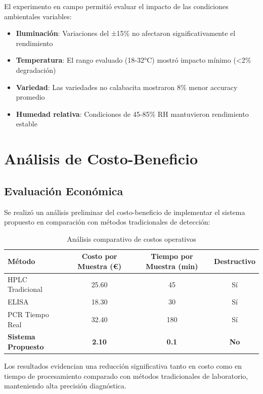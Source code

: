 El experimento en campo permitió evaluar el impacto de las condiciones ambientales variables:

\begin{itemize}
    \item \textbf{Iluminación}: Variaciones del ±15\% no afectaron significativamente el rendimiento
    \item \textbf{Temperatura}: El rango evaluado (18-32°C) mostró impacto mínimo (<2\% degradación)
    \item \textbf{Variedad}: Las variedades no calabacita mostraron 8\% menor accuracy promedio
    \item \textbf{Humedad relativa}: Condiciones de 45-85\% RH mantuvieron rendimiento estable
\end{itemize}

\section{Análisis de Costo-Beneficio}

\subsection{Evaluación Económica}

Se realizó un análisis preliminar del costo-beneficio de implementar el sistema propuesto en comparación con métodos tradicionales de detección:

\begin{table}[h!]
\centering
\caption{Análisis comparativo de costos operativos}
\begin{tabular}{|l|c|c|c|}
\hline
\textbf{Método} & \textbf{Costo por Muestra (€)} & \textbf{Tiempo por Muestra (min)} & \textbf{Destructivo} \\
\hline
HPLC Tradicional & 25.60 & 45 & Sí \\
\hline
ELISA & 18.30 & 30 & Sí \\
\hline
PCR Tiempo Real & 32.40 & 180 & Sí \\
\hline
\textbf{Sistema Propuesto} & \textbf{2.10} & \textbf{0.1} & \textbf{No} \\
\hline
\end{tabular}
\label{tab:cost_analysis}
\end{table}

Los resultados evidencian una reducción significativa tanto en costo como en tiempo de procesamiento comparado con métodos tradicionales de laboratorio, manteniendo alta precisión diagnóstica.

